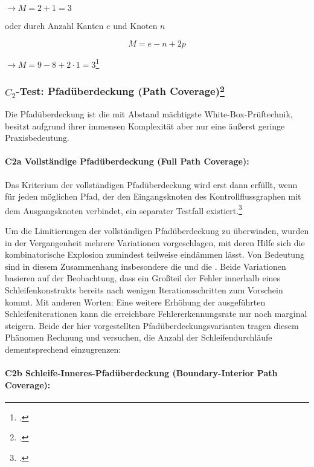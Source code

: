 \documentclass{lehramt-informatik-haupt}
\begin{document}
$\rightarrow M = 2 + 1 = 3$

\noindent
oder durch Anzahl Kanten $e$ und Knoten $n$

\begin{displaymath}
M = e - n + 2p
\end{displaymath}

$\rightarrow M = 9 - 8 + 2 \cdot 1 = 3$\footcite[Kapitel 4.4.6
McCabe-Überdeckung, Seite 216220]{hoffmann}

%

\subsubsection{$C_2$-Test: Pfadüberdeckung (Path Coverage)\footcite[Seite 39]{sosy:fs:5}}

Die Pfadüberdeckung ist die mit Abstand mächtigste
White-Box-Prüftechnik, besitzt aufgrund ihrer immensen Komplexität
aber nur eine äußerst geringe Praxisbedeutung.

%

\paragraph{C2a Vollständige Pfadüberdeckung (Full Path Coverage):}

Das Kriterium der vollständigen Pfadüberdeckung wird erst dann erfüllt,
wenn für jeden möglichen Pfad, der den Eingangsknoten des
Kontrollflussgraphen mit dem Ausgangsknoten verbindet, ein separater
Testfall existiert.\footcite[Seite 210]{hoffmann}

Um die Limitierungen der vollständigen Pfadüberdeckung zu überwinden,
wurden in der Vergangenheit mehrere Variationen vorgeschlagen, mit deren
Hilfe sich die kombinatorische Explosion zumindest teilweise eindämmen
lässt. Von Bedeutung sind in diesem Zusammenhang insbesondere die
 und die . Beide Variationen basieren auf der Beobachtung, dass
ein Großteil der Fehler innerhalb eines Schleifenkonstrukts bereits nach
wenigen Iterationsschritten zum Vorschein kommt. Mit anderen Worten:
Eine weitere Erhöhung der ausgeführten Schleifeniterationen kann die
erreichbare Fehlererkennungsrate nur noch marginal steigern. Beide der
hier vorgestellten Pfadüberdeckungsvarianten tragen diesem Phänomen
Rechnung und versuchen, die Anzahl der Schleifendurchläufe
dementsprechend einzugrenzen:

%

\paragraph{C2b Schleife-Inneres-Pfadüberdeckung (Boundary-Interior Path Coverage):}
\end{document}
